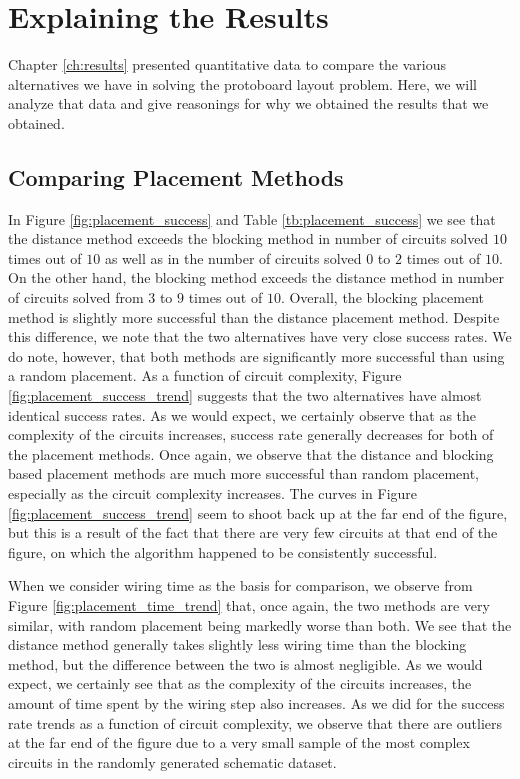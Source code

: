 \section{Explaining the Results}

Chapter \ref{ch:results} presented quantitative data to compare the various
alternatives we have in solving the protoboard layout problem. Here, we will
analyze that data and give reasonings for why we obtained the results
that we obtained.

\subsection{Comparing Placement Methods}

In Figure \ref{fig:placement_success} and Table \ref{tb:placement_success} we
see that the distance method exceeds the blocking method in number of circuits
solved $10$ times out of $10$ as well as in the number of circuits solved $0$
to $2$ times out of $10$. On the other hand, the blocking method exceeds the
distance method in number of circuits solved from $3$ to $9$ times out
of $10$. Overall, the blocking placement method is slightly more successful
than the distance placement method. Despite this difference, we note that the
two alternatives have very
close success rates. We do note, however, that both methods are significantly
more successful than using a random placement. As a function of circuit
complexity, Figure
\ref{fig:placement_success_trend} suggests that the two alternatives have almost
identical success rates. As we would expect, we certainly observe that as the
complexity of the circuits
increases, success rate generally decreases for both of the placement methods.
Once again, we observe that the distance and blocking based placement methods
are much more successful than random placement, especially as the circuit
complexity increases.
The curves in Figure \ref{fig:placement_success_trend} seem to shoot back up
at the far end of the figure, but this is a result of the fact that there are
very few circuits at that end of the figure, on which the algorithm happened to
be consistently successful.

When we consider wiring time as the basis for comparison, we observe from
Figure \ref{fig:placement_time_trend} that, once again, the two methods are
very similar, with random placement being markedly worse than both.
We see that the distance method generally takes slightly less
wiring time than the blocking method, but the difference between the two is
almost negligible. As we would expect, we certainly see that as the complexity
of the circuits increases, the amount of time spent by the wiring step also
increases. As we did for the success rate trends as a function of circuit
complexity, we observe that there are outliers at the far end of the figure due
to a very small sample of the most complex circuits in the randomly generated
schematic dataset.

